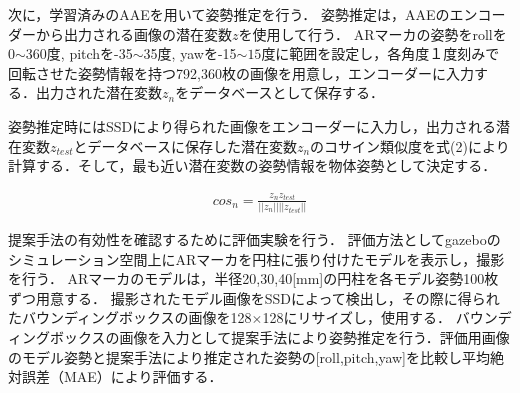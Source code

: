 \documentclass{jsarticle}
\begin{document}
次に，学習済みのAAEを用いて姿勢推定を行う．
姿勢推定は，AAEのエンコーダーから出力される画像の潜在変数$z$を使用して行う．
ARマーカの姿勢をrollを0$\sim$360度, pitchを-35$\sim$35度, yawを-15$\sim15$度に範囲を設定し，各角度１度刻みで回転させた姿勢情報を持つ792,360枚の画像を用意し，エンコーダーに入力する．出力された潜在変数$z_n$をデータベースとして保存する．

姿勢推定時にはSSDにより得られた画像をエンコーダーに入力し，出力される潜在変数$z_{test}$とデータベースに保存した潜在変数$z_n$のコサイン類似度を式(2)により計算する．そして，最も近い潜在変数の姿勢情報を物体姿勢として決定する．



\begin{eqnarray}
\label{cos}
cos_n=\frac{z_n z_{test}}{||z_n|| ||z_{test}||}
\end{eqnarray}







提案手法の有効性を確認するために評価実験を行う．
評価方法としてgazeboのシミュレーション空間上にARマーカを円柱に張り付けたモデルを表示し，撮影を行う．
ARマーカのモデルは，半径20,30,40[mm]の円柱を各モデル姿勢100枚ずつ用意する．
撮影されたモデル画像をSSDによって検出し，その際に得られたバウンディングボックスの画像を128$\times$128にリサイズし，使用する．
バウンディングボックスの画像を入力として提案手法により姿勢推定を行う．評価用画像のモデル姿勢と提案手法により推定された姿勢の[roll,pitch,yaw]を比較し平均絶対誤差（MAE）により評価する．
\end{document}
